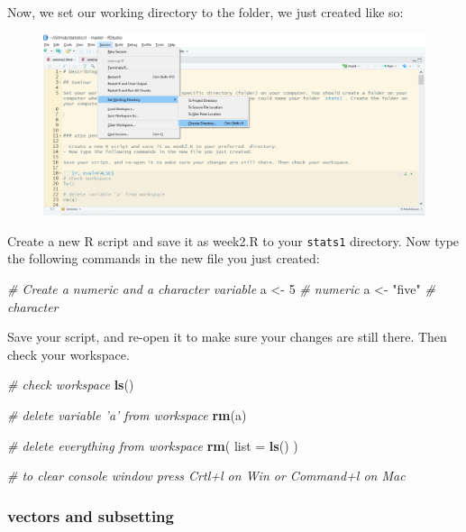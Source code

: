 \documentclass[]{article}
\newenvironment{Shaded}{\begin{snugshade}}{\end{snugshade}}
\newcommand{\KeywordTok}[1]{\textcolor[rgb]{0.13,0.29,0.53}{\textbf{#1}}}
\newcommand{\DataTypeTok}[1]{\textcolor[rgb]{0.13,0.29,0.53}{#1}}
\newcommand{\DecValTok}[1]{\textcolor[rgb]{0.00,0.00,0.81}{#1}}
\newcommand{\StringTok}[1]{\textcolor[rgb]{0.31,0.60,0.02}{#1}}
\newcommand{\CommentTok}[1]{\textcolor[rgb]{0.56,0.35,0.01}{\textit{#1}}}
\newcommand{\NormalTok}[1]{#1}
\theoremstyle{definition}
\theoremstyle{definition}
\theoremstyle{definition}
\theoremstyle{remark}
\begin{document}
Now, we set our working directory to the folder, we just created like
so:

\begin{figure}
\centering
\includegraphics{./img/setwdir.png}
\caption{}
\end{figure}

Create a new R script and save it as week2.R to your \texttt{stats1}
directory. Now type the following commands in the new file you just
created:

\begin{Shaded}
\begin{Highlighting}[]
\CommentTok{# Create a numeric and a character variable}
\NormalTok{a <-}\StringTok{ }\DecValTok{5} \CommentTok{# numeric}
\NormalTok{a <-}\StringTok{ "five"} \CommentTok{# character}
\end{Highlighting}
\end{Shaded}

Save your script, and re-open it to make sure your changes are still
there. Then check your workspace.

\begin{Shaded}
\begin{Highlighting}[]
\CommentTok{# check workspace}
\KeywordTok{ls}\NormalTok{()}

\CommentTok{# delete variable 'a' from workspace}
\KeywordTok{rm}\NormalTok{(a)}

\CommentTok{# delete everything from workspace}
\KeywordTok{rm}\NormalTok{( }\DataTypeTok{list =} \KeywordTok{ls}\NormalTok{() )}

\CommentTok{# to clear console window press Crtl+l on Win or Command+l on Mac}
\end{Highlighting}
\end{Shaded}

\subsubsection{vectors and subsetting}\label{vectors-and-subsetting}
\end{document}
